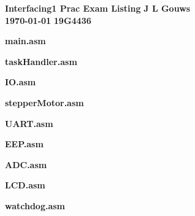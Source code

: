 \documentclass[a4paper,12pt]{article}
\newcommand\block[1]{\hspace*{#1}}
\begin{document}
\selectfont
\thispagestyle{empty}

{\Large \textbf{Interfacing1 Prac Exam Listing}} \hfill {\Large \textbf{J L Gouws}}\\
\block{1.0cm} {\large \textbf{\today}} \hfill {\large \textbf{19G4436}}\\
\begin{center}
  \Large
  \textbf{
    main.asm
  }
\end{center}

\begin{center}
  \Large
  \textbf{
    taskHandler.asm
  }
\end{center}

\begin{center}
  \Large
  \textbf{
    IO.asm
  }
\end{center}

\begin{center}
  \Large
  \textbf{
    stepperMotor.asm
  }
\end{center}

\begin{center}
  \Large
  \textbf{
    UART.asm
  }
\end{center}

\begin{center}
  \Large
  \textbf{
    EEP.asm
  }
\end{center}

\begin{center}
  \Large
  \textbf{
    ADC.asm
  }
\end{center}

\begin{center}
  \Large
  \textbf{
    LCD.asm
  }
\end{center}

\begin{center}
  \Large
  \textbf{
    watchdog.asm
  }
\end{center}

\end{document}
